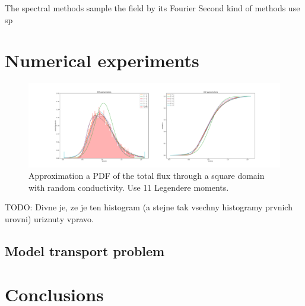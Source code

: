 \documentclass{article}
\def\todo#1{{\color{red}TODO: #1}}
\begin{document}
The spectral methods sample the field by its Fourier Second kind of methods use sp

\section{Numerical experiments}
\begin{figure}
    \centering
    \includegraphics[width=\textwidth]{01_cond_pdf_cdf.pdf}
    \caption{Approximation a PDF of the total flux through a square domain with random conductivity. Use 11 Legendere moments.}
    \label{fig:flux_approx_pdf}
\end{figure}
\todo{Divne je, ze je ten histogram (a stejne tak vsechny histogramy prvnich urovni) uriznuty vpravo.}

\subsection{Model transport problem}
\section{Conclusions}





\end{document}
